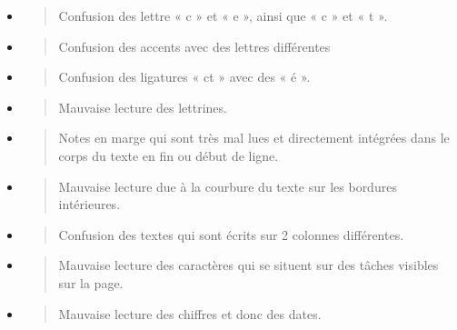 \documentclass[a4paper,12pt,twoside]{book}
\begin{document}
\begin{itemize}
	\item
	\begin{quote}
		Confusion des lettre « c » et « e », ainsi que « c » et « t ».
	\end{quote}
	\item
	\begin{quote}
		Confusion des accents avec des lettres différentes
	\end{quote}
	\item
	\begin{quote}
		Confusion des ligatures « ct » avec des « é ».
	\end{quote}
	\item
	\begin{quote}
		Mauvaise lecture des lettrines.
	\end{quote}
	\item
	\begin{quote}
		Notes en marge qui sont très mal lues et directement intégrées dans le
		corps du texte en fin ou début de ligne.
	\end{quote}
	\item
	\begin{quote}
		Mauvaise lecture due à la courbure du texte sur les bordures
		intérieures.
	\end{quote}
	\item
	\begin{quote}
		Confusion des textes qui sont écrits sur 2 colonnes différentes.
	\end{quote}
	\item
	\begin{quote}
		Mauvaise lecture des caractères qui se situent sur des tâches visibles
		sur la page.
	\end{quote}
	\item
	\begin{quote}
		Mauvaise lecture des chiffres et donc des dates. \\
	\end{quote}
\end{itemize}
\end{document}
